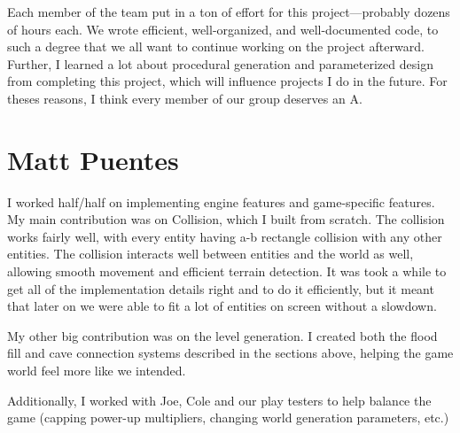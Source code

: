 \documentclass[a4paper, 12pt]{article}
\begin{document}
Each member of the team put in a ton of effort for this project---probably
dozens of hours each. We wrote efficient, well-organized, and well-documented
code, to such a degree that we all want to continue working on the project
afterward. Further, I learned a lot about procedural generation and
parameterized design from completing this project, which will influence projects
I do in the future. For theses reasons, I think every member of our group
deserves an A.

\section{Matt Puentes}

I worked half/half on implementing engine features and game-specific features.
My main contribution was on Collision, which I built from scratch. The collision
works fairly well, with every entity having a-b rectangle collision with any
other entities. The collision interacts well between entities and the world as
well, allowing smooth movement and efficient terrain detection. It was took a
while to get all of the implementation details right and to do it efficiently, 
but it meant that later on we were able to fit a lot of entities on screen
without a slowdown.

My other big contribution was on the level generation. I created both the
flood fill and cave connection systems described in the sections above, helping
the game world feel more like we intended.

Additionally, I worked with Joe, Cole and our play testers to help balance the
game (capping power-up multipliers, changing world generation parameters, etc.)
\end{document}
